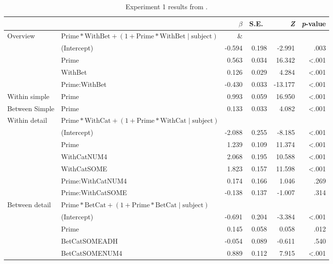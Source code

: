 \documentclass[10pt]{article}
\begin{document}
\begin{multicols}{2}
\begin{table*}[ht]
  \caption{Experiment 1 results from \textcite[125]{Bott:2016aa}.}\vspace{-20pt}
  \begin{center}
    \begin{tabular}{llrrrr}
      \hline
      & & \(\beta\) & S.E.\ & \emph{Z} & \emph{p}-value  \\
      \hline
      Overview & \(\text{Prime} * \text{WithBet} + (1 + \text{Prime} * \text{WithBet} \mid \text{subject})\) & \& & & \\
      & (Intercept) & -0.594 & 0.198 & -2.991 & .003 \\
      & Prime & 0.563 & 0.034 & 16.342 & <.001 \\
      & WithBet & 0.126 & 0.029 & 4.284 & <.001 \\
      & Prime:WithBet & -0.430 & 0.033 & -13.177 & <.001 \\
      Within simple & Prime & 0.993 & 0.059 & 16.950 & <.001 \\
      Between Simple & Prime & 0.133 & 0.033 & 4.082 & <.001 \\
      Within detail & \multicolumn{2}{l}{\(\text{Prime} * \text{WithCat} + (1 + \text{Prime} * \text{WithCat} \mid \text{subject})\)}  & & & \\
      & (Intercept)  & -2.088 & 0.255 & -8.185 & <.001\\
      & Prime & 1.239 & 0.109 & 11.374 & <.001 \\
      & WithCatNUM4 & 2.068 & 0.195 & 10.588 & <.001 \\
      & WithCatSOME & 1.823 & 0.157 & 11.598 & <.001 \\
      & Prime:WithCatNUM4 & 0.174 & 0.166 & 1.046 & .269 \\
      & Prime:WithCatSOME & -0.138 & 0.137 & -1.007 & .314 \\
      Between detail & \multicolumn{2}{l}{\(\text{Prime} * \text{BetCat} + (1 + \text{Prime} * \text{BetCat} \mid \text{subject})\)}  & & & \\
      & (Intercept)  & -0.691 & 0.204 & -3.384 & <.001\\
      & Prime & 0.145 & 0.058 & 0.058 & .012 \\
      & BetCatSOMEADH & -0.054 & 0.089 & -0.611 & .540 \\
      & BetCatSOMENUM4 & 0.889 & 0.112 & 7.915 & <.001 \\

\end{tabular}
\end{center}
\end{table*}
\end{multicols}
\end{document}

